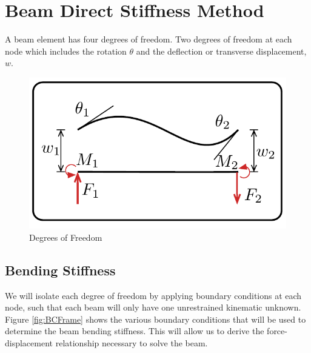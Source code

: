\section{Beam Direct Stiffness Method}

A beam element has four degrees of freedom. Two degrees of freedom at each node which includes the rotation $\theta$ and the deflection or transverse displacement, $w$.

\begin{figure}[h]	\centerline{\includegraphics[width=0.7\columnwidth]{Figures/DeflectionandRotation}}
	\caption{Degrees of Freedom}
	\label{fig:DeflectionandRotation}
\end{figure}

\subsection{Bending Stiffness}

We will isolate each degree of freedom by applying boundary conditions at each node, such that each beam will only have one unrestrained kinematic unknown. Figure \ref{fig:BCFrame} shows the various boundary conditions that will be used to determine the beam bending stiffness. This will allow us to derive the force-displacement relationship necessary to solve the beam.

